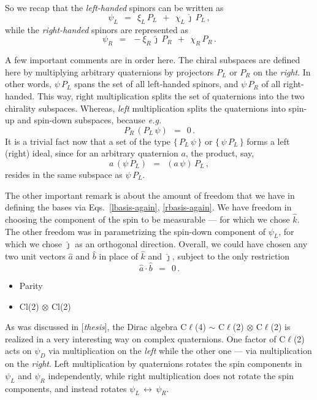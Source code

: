 \documentclass[epsfig,12pt]{article}
\newcommand{\jj}{\hat\jmath}
\newcommand{\kk}{\hat k}
\begin{document}
	So we recap that the \emph{left-handed} spinors can be written as
\begin{equation}
\label{lbasis-again}
	\psi_L	~~=~~	\xi_L\,P_L  ~~+~~  \chi_L\,\jj\,P_L\,,
\end{equation}
	while the \emph{right-handed} spinors are represented as
\begin{equation}
\label{rbasis-again}
	\psi_R	~~=~~	-\xi_R\,\jj\,P_R  ~~+~~  \chi_R\,P_R\,.
\end{equation}

	A few important comments are in order here.
	The chiral subspaces are defined here by multiplying
	arbitrary quaternions by projectors $ P_L $ or $ P_R $ on the \emph{right}.
	In other words, $ \psi\, P_L $ spans the set of all left-handed spinors,
	and $ \psi\, P_R $ of all right-handed.
	This way, right multiplication splits the set of quaternions into
	the two chirality subspaces.
	Whereas, \emph{left} multiplication splits the quaternions into
	spin-up and spin-down subspaces, because \emph{e.g.}
\[
	P_R\, (P_L\, \psi)	~~=~~	0\,.
\]
	It is a trivial fact now that a set of the type $ \big\{\, P_L\, \psi \,\} $ or $ \big\{\, \psi\, P_L \,\} $
	forms a left (right) ideal, since for an arbitrary quaternion $ a $,
	the product, say,
\[
	a\, (\psi\, P_L)	~~=~~	(a\, \psi)\, P_L\,,
\]
	resides in the same subspace as $ \psi\, P_L $.

	The other important remark is about the amount of freedom that we have in defining
	the bases via Eqs.~\eqref{lbasis-again}, \eqref{rbasis-again}.
	We have freedom in choosing the component of the spin to be measurable --- for which we chose $ \kk $.
	The other freedom was in parametrizing the spin-down component of $ \psi_L $,
	for which we chose $ \jj $ as an orthogonal direction.
	Overall, we could have chosen any two unit vectors $ \hat a $ and $ \hat b $ in place of $ \kk $
	and $ \jj $, subject to the only restriction
\[
	\hat a \cdot \hat b	~~=~~	0\,.
\]

\begin{itemize}

\item	Parity

\item	Cl(2) $ \otimes $ Cl(2)

\end{itemize}

	As was discussed in [\emph{thesis}], the Dirac algebra
	C$\ell$(4) $ \sim $  C$\ell$(2) $ \otimes $ C$\ell$(2)
	is realized in a very interesting way on complex quaternions.
	One factor of C$\ell$(2) acts on $ \psi_D $ via multiplication on the \emph{left}
	while the other one --- via multiplication on the \emph{right}.
	Left multiplication by quaternions rotates the spin components in 
	$ \psi_L $ and $ \psi_R $ independently, while right multiplication
	does not rotate the spin components, and instead rotates 
	$ \psi_L \,\leftrightarrow\, \psi_R $.
	
\end{document}
